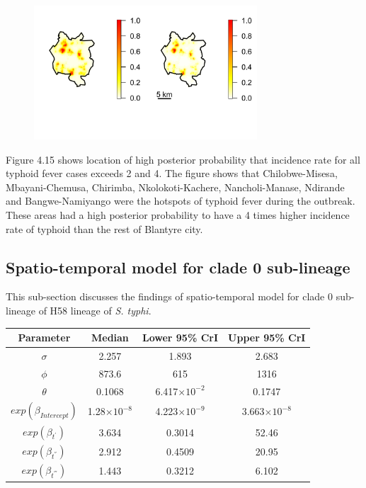 \documentclass[12pt,a4paper]{report}
\begin{document}
\begin{figure}[h]
\begin{center}
\includegraphics[width = \linewidth, height = 50mm]{Exceedance Probabilities - All Cases.png}
\end{center}
\end{figure}

Figure 4.15 shows location of high posterior probability that incidence rate for all typhoid fever cases exceeds 2 and 4. The figure shows that Chilobwe-Misesa, Mbayani-Chemusa, Chirimba, Nkolokoti-Kachere, Nancholi-Manase, Ndirande and Bangwe-Namiyango were the hotspots of typhoid fever during the outbreak. These areas had a high posterior probability to have a 4 times higher incidence rate of typhoid than the rest of Blantyre city.

\subsection{Spatio-temporal model for clade 0 sub-lineage}

This sub-section discusses the findings of spatio-temporal model for clade 0 sub-lineage of H58 lineage of \textit{S. typhi}.

\begin{table}[h]
    \centering
    \begin{tabular}{cccc}
    \toprule
         Parameter & Median & Lower 95\% CrI & Upper 95\% CrI\\ \midrule
        $\sigma$ & 2.257 & 1.893 & 2.683 \\
        $\phi$ & 873.6 & 615 & 1316 \\
        $\theta$ & 0.1068 & 6.417$\times10^{-2}$ & 0.1747 \\
        $exp(\beta_{Intercept})$ & 1.28$\times10^{-8}$ & 4.223$\times10^{-9}$ & 3.663$\times10^{-8}$ \\
        $exp(\beta_{t^{'}})$ & 3.634 & 0.3014 & 52.46 \\
        $exp(\beta_{t^{''}})$ & 2.912 & 0.4509 & 20.95 \\
        $exp(\beta_{t^{'''}})$ & 1.443 & 0.3212 & 6.102 \\
        \bottomrule
    \end{tabular}
\end{table}
\end{document}
